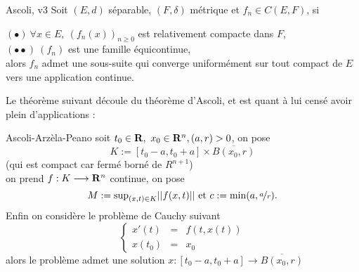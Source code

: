 \documentclass[a4paper,11pt, twoside]{article}
\begin{document}
\begin{thC}{Ascoli, v3}
  Soit $(E,d)$ séparable, $(F,\delta)$ métrique et $f_n\in C(E,F)$, si

  $(\bullet)\ \forall x\in E,\ \left(f_n(x)\right)_{n\geqslant 0}$ est relativement compacte dans $F$,\\
  $(\bullet\bullet)\ \left(f_n\right)$ est une famille équicontinue,\\

  alors $f_n$ admet une sous-suite qui converge uniformément sur tout compact de $E$ vers une application continue.
\end{thC}


Le théorème suivant découle du théorème d'Ascoli, et est quant à lui censé avoir plein d'applications :

\begin{thC}{Ascoli-Arzèla-Peano}
  soit $t_0\in\mathbf R,\ x_0\in\mathbf R^n, (a,r)>0$, on pose 
  $$K:=[t_0-a,t_0+a]\times \overline{B(x_0,r)}$$
  (qui est compact car fermé borné de $R^{n+1}$)\\
  on prend $f:K\longrightarrow \mathbf R^n$ continue, on pose
  $$M:=\mathrm{sup}_{(x,t)\in K}||f(x,t)||\text{ et }c:=\mathrm{min}(a,\nicefrac{a}{r}).$$
  Enfin on considère le problème de Cauchy suivant 
  $$\left\{\begin{array}{rcl}
    x'(t)&=&f(t,x(t))\\
    x(t_0)&=&x_0
  \end{array}\right.$$
  alors le problème admet une solution $x:[t_0-a,t_0+a]\longrightarrow \overline{B(x_0,r)}$
\end{thC}
\end{document}
